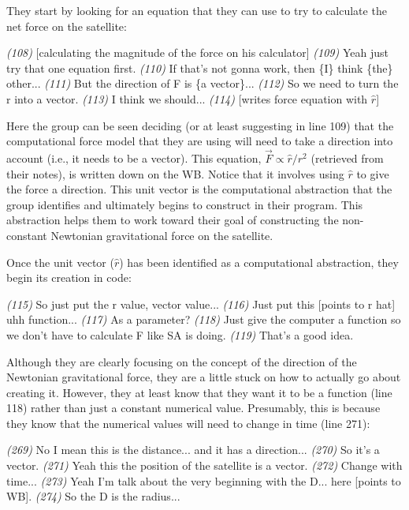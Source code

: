 \documentclass{msuphddissertation}
\begin{document}
\begin{doublespace}
They start by looking for an equation that they can use to try to calculate the net force on the satellite: \begin{description}
\SA \textit{(108)} [calculating the magnitude of the force on his calculator]
\SC \textit{(109)} Yeah just try that one {equation} first.		
\SC \textit{(110)} If that's not gonna work, then \{I\} think \{the\} other...
\SD \textit{(111)} But the direction of F is \{a vector\}...	
\SD \textit{(112)} So we need to turn the r into a vector.
\SC \textit{(113)} I think we should...		
\SD \textit{(114)} [writes force equation with $\hat{r}$]
\end{description}  Here the group can be seen deciding (or at least suggesting in line 109) that the computational force model that they are using will need to take a direction into account (i.e., it needs to be a vector).  This equation, $\vec{F}\propto\hat{r}/r^{2}$ (retrieved from their notes), is written down on the WB.  Notice that it involves using $\hat{r}$ to give the force a direction.  This unit vector is the computational abstraction that the group identifies and ultimately begins to construct in their program.  This abstraction helps them to work toward their goal of constructing the non-constant Newtonian gravitational force on the satellite.

Once the unit vector ($\hat{r}$) has been identified as a computational abstraction, they begin its creation in code:\begin{description}
\SD \textit{(115)} So just put the r value, vector value...
\SD \textit{(116)} Just put this [points to r hat] uhh function...
\SB \textit{(117)} As a parameter?			
\SD \textit{(118)} Just give the computer a function so we don't have to calculate F {like SA is doing}.	
\SB \textit{(119)} That's a good idea.
\end{description} Although they are clearly focusing on the concept of the direction of the Newtonian gravitational force, they are a little stuck on how to actually go about creating it.  However, they at least know that they want it to be a function (line 118) rather than just a constant numerical value.  Presumably, this is because they know that the numerical values will need to change in time (line 271):\begin{description}
\SD \textit{(269)} No I mean this is the distance... and it has a direction...	
\SB \textit{(270)} So it's a vector.
\SD \textit{(271)} Yeah this {the position of the satellite} is a vector.
\SD \textit{(272)} Change with time...
\SC \textit{(273)} Yeah I'm talk about the very beginning with the D... here [points to WB].
\SB \textit{(274)} So the D is the radius...
\end{description}


\end{doublespace}
\end{document}
